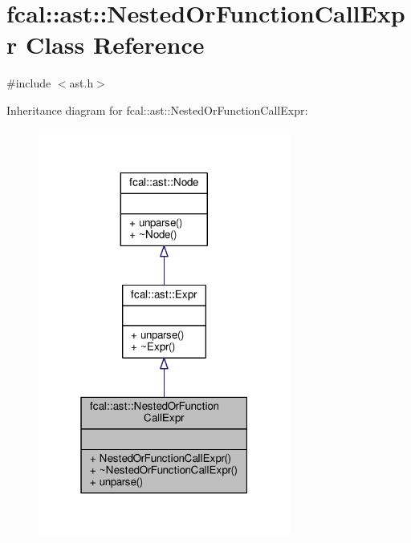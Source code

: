 \hypertarget{classfcal_1_1ast_1_1NestedOrFunctionCallExpr}{}\section{fcal\+:\+:ast\+:\+:Nested\+Or\+Function\+Call\+Expr Class Reference}
\label{classfcal_1_1ast_1_1NestedOrFunctionCallExpr}


{\ttfamily \#include $<$ast.\+h$>$}



Inheritance diagram for fcal\+:\+:ast\+:\+:Nested\+Or\+Function\+Call\+Expr\+:
\nopagebreak
\begin{figure}[H]
\begin{center}
\leavevmode
\includegraphics[width=235pt]{classfcal_1_1ast_1_1NestedOrFunctionCallExpr__inherit__graph}
\end{center}
\end{figure}



